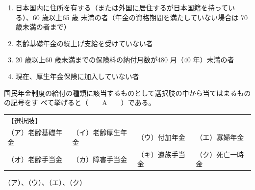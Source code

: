 \begin{answerbox}
  \begin{enumerate}[(1)]
    \item 日本国内に住所を有する（または外国に居住するが日本国籍を持っている）、60 歳以上65 歳
未満の者（年金の資格期間を満たしていない場合は 70 歳未満の者まで）
  \item 老齢基礎年金の繰上げ支給を受けていない者
  \item 20 歳以上60 歳未満までの保険料の納付月数が480 月（40 年）未満の者
  \item 現在、厚生年金保険に加入していない者
  \end{enumerate}
\end{answerbox}

\begin{fillblank}[年金1 2023 問題1(5)イ(d)]
  国民年金制度の給付の種類に該当するものとして選択肢の中から当てはまるものの記号をす
べて挙げると（　　A　　）である。

\begin{table}[htbp]
  \centering
  \begin{tabular}{|llll|} \hline
    【選択肢】 & & & \\ 
    （ア）老齢基礎年金 & （イ）老齢厚生年金 & （ウ）付加年金 & （エ）寡婦年金 \\ 
    （オ）老齢手当金 & （カ）障害手当金 & （キ）遺族手当金 & （ク）死亡一時金 \\ \hline
  \end{tabular}
\end{table}
\end{fillblank}

\begin{answerbox}
  （ア）、（ウ）、（エ）、（ク）
\end{answerbox}

\newpage